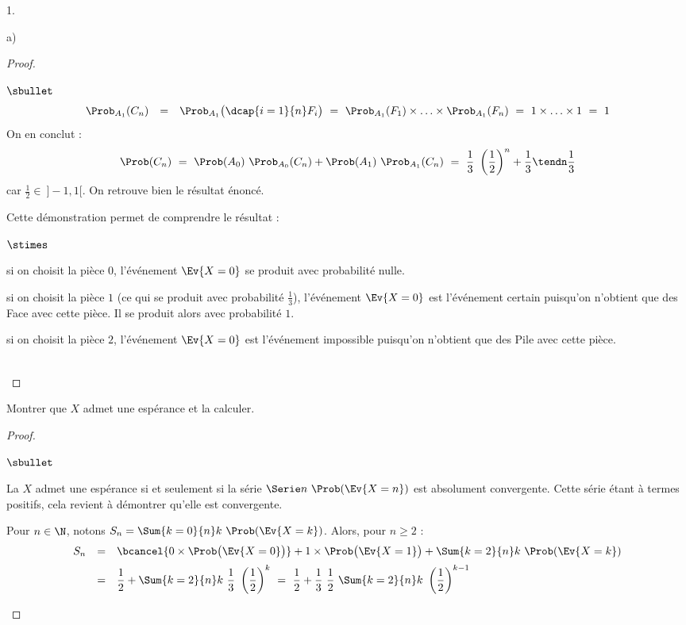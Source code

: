 \documentclass[11pt]{article}%
\begin{document}
\begin{noliste}{1.}
\begin{noliste}{a)}
\begin{proof}
\begin{remarkL}{.98}
\begin{noliste}{$\sbullet$}
\[\begin{array}{rcl}
            \Prob_{A_1}( C_n ) & = & \Prob_{A_1}\big( \dcap{i=1}{n} F_i
            \big) \ = \ \Prob_{A_1}(F_1) \times \ldots \times \Prob_{A_1}(F_n)
            \ = \ 1 \times \ldots \times 1 \ = \ 1
          \end{array}
          \]
          On en conclut :
          \[
          \Prob(C_n) \ = \ \Prob(A_0) \ \Prob_{A_0}(C_n) + \Prob(A_1)
          \ \Prob_{A_1}(C_n) \ = \ \dfrac{1}{3} \ \left( \dfrac{1}{2}
          \right)^n + \dfrac{1}{3} \tendn \dfrac{1}{3}
          \]
          car $\frac{1}{2} \in \ ]-1, 1[$. On retrouve bien le
          résultat énoncé.
        \item Cette démonstration permet de comprendre le résultat :
          \begin{noliste}{$\stimes$}
          \item si on choisit la pièce $0$, l'événement
            $\Ev{X = 0}$ se produit avec probabilité nulle.
          \item si on choisit la pièce $1$ (ce qui se produit avec
            probabilité $\frac{1}{3}$), l'événement $\Ev{X = 0}$ est
            l'événement certain puisqu'on n'obtient que des Face avec
            cette pièce. Il se produit alors avec probabilité $1$.
          \item si on choisit la pièce $2$, l'événement $\Ev{X = 0}$
            est l'événement impossible puisqu'on n'obtient que des
            Pile avec cette pièce.
          \end{noliste}
        \end{noliste}       
      \end{remarkL}~\\[-1.4cm]
    \end{proof}
  \end{noliste}

\item Montrer que $X$ admet une espérance et la calculer.

  \begin{proof}~%
    \begin{noliste}{$\sbullet$}
    \item La \var $X$ admet une espérance si et seulement si la série
      $\Serie n \ \Prob(\Ev{X = n})$ est absolument convergente. Cette
      série étant à termes positifs, cela revient à démontrer qu'elle
      est convergente.

    \item Pour $n \in \N$, notons $S_n = \Sum{k = 0}{n} k \
      \Prob(\Ev{X = k})$. Alors, pour $n \geq 2$ :
      \[
      \begin{array}{rcl}
        S_n & = & \bcancel{0 \times \Prob\big( \Ev{X = 0}\big)} + 1
        \times \Prob\big( \Ev{X = 1}\big) + \Sum{k = 2}{n} k \
        \Prob(\Ev{X = k}) 
        \\[.2cm]
        & = & \dfrac{1}{2} + \Sum{k = 2}{n} k \
        \dfrac{1}{3} \ \left( \dfrac{1}{2} \right)^k
        \ = \ \dfrac{1}{2} + \dfrac{1}{3} \ \dfrac{1}{2} \ \Sum{k =
          2}{n} k \ \left( \dfrac{1}{2} \right)^{k-1}
      \end{array}
      \]



\end{noliste}
\end{proof}
\end{noliste}
\end{document}
